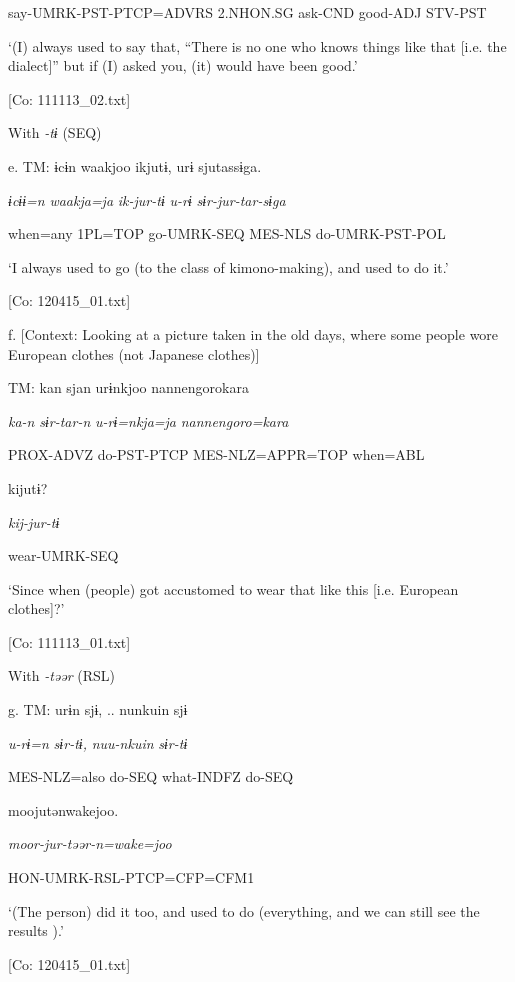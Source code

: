      say-UMRK-PST-PTCP=ADVRS  2.NHON.SG  ask-CND  good-ADJ  STV-PST

      ‘(I) always used to say that, “There is no one who knows things like that [i.e. the dialect]” but if (I) asked you, (it) would have been good.’

      [Co: 111113\_02.txt]

  With \textit{{}-tɨ} (SEQ)

  e.  TM:  ɨcɨn  waakjoo  ikjutɨ,  urɨ  sjutassɨga.

      \textit{ɨcɨɨ=n}  \textit{waakja=ja}  \textit{ik-jur-tɨ}  \textit{u-rɨ}  \textit{sɨr-jur-tar-sɨga}

      when=any  1PL=TOP  go-UMRK-SEQ  MES-NLS  do-UMRK-PST-POL

      ‘I always used to go (to the class of kimono-making), and used to do it.’

      [Co: 120415\_01.txt]

  f.  [Context: Looking at a picture taken in the old days, where some people wore European clothes (not Japanese clothes)]

    TM:  kan  sjan  urɨnkjoo  {\textbar}nannengoro{\textbar}kara

      \textit{ka-n}  \textit{sɨr-tar-n}  \textit{u-rɨ=nkja=ja}  \textit{nannengoro=kara}

      PROX-ADVZ  do-PST-PTCP  MES-NLZ=APPR=TOP  when=ABL

      kijutɨ?

      \textit{kij-jur-tɨ}

      wear-UMRK-SEQ

      ‘Since when (people) got accustomed to wear that like this [i.e. European clothes]?’

      [Co: 111113\_01.txt]

  With \textit{{}-təər} (RSL)

  g.  TM:  urɨn  sjɨ, ..  nunkuin  sjɨ

      \textit{u-rɨ=n}  \textit{sɨr-tɨ,}  \textit{nuu-nkuin}  \textit{sɨr-tɨ}

      MES-NLZ=also  do-SEQ  what-INDFZ  do-SEQ

      moojutənwakejoo.

      \textit{moor-jur-təər{}-n=wake=joo}

      HON-UMRK-RSL-PTCP=CFP=CFM1

      ‘(The person) did it too, and used to do (everything, and we can still see the results ).’

      [Co: 120415\_01.txt]

